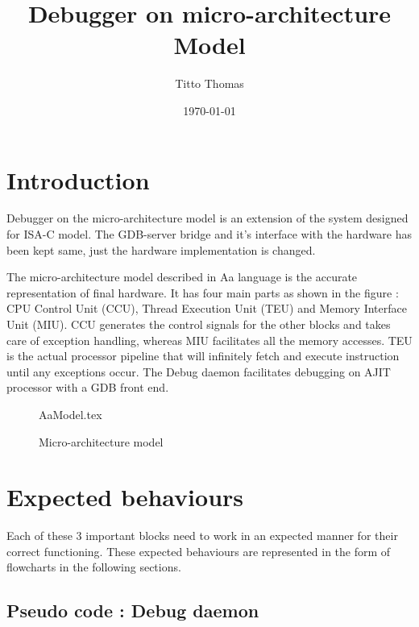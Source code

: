 \documentclass[a4paper, 11pt]{article}
\title{Debugger on micro-architecture Model}
\author{Titto Thomas}
\date{\today}
\begin{document}
\maketitle

\section{Introduction}
Debugger on the micro-architecture model is an extension of the system designed for ISA-C model. The GDB-server bridge and it’s interface with the hardware has been kept same, just the hardware implementation is changed.

The micro-architecture model described in Aa language is the accurate representation of final hardware. It has four main parts as shown in the figure  : CPU Control Unit (CCU), Thread Execution Unit (TEU) and Memory Interface Unit (MIU). CCU generates the control signals for the other blocks and takes care of exception handling, whereas MIU facilitates all the memory accesses. TEU is the actual processor pipeline that will infinitely fetch and execute instruction until any exceptions occur. The Debug daemon facilitates debugging on AJIT processor with a GDB front end.

\vspace*{1cm}

\begin{figure}[h!]
	\centering
	\def\svgwidth{\textwidth}
	{AaModel.tex}
	\caption{Micro-architecture model}
	\label{uAmodel}
\end{figure}

\section{Expected behaviours}

Each of these 3 important blocks need to work in an expected manner for their correct functioning. These expected behaviours are represented in the form of flowcharts in the following sections.

\subsection{Pseudo code : Debug daemon}
\end{document}
